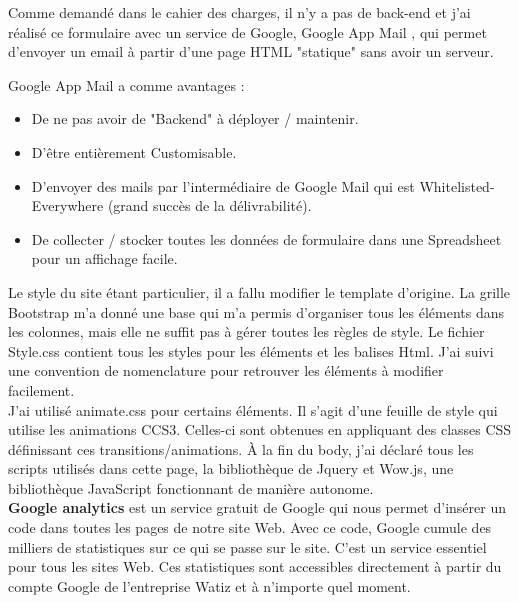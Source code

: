 \documentclass[a4paper, 12pt]{report}
\begin{document}
Comme demandé dans le cahier des charges, il n’y a pas de back-end et j’ai réalisé ce formulaire avec un service de Google, Google App Mail \cite{8}, qui permet d'envoyer un email à partir d'une page HTML "statique" sans  avoir un serveur.

Google App Mail a comme avantages :
\begin{itemize}
\item De ne pas avoir  de "Backend" à déployer / maintenir.
\item D’être entièrement Customisable.
\item D’envoyer des mails par l'intermédiaire de Google Mail qui est Whitelisted-Everywhere (grand succès de la délivrabilité).
\item De collecter / stocker toutes les données de formulaire dans une Spreadsheet pour un affichage facile.
\end{itemize}
Le style du site étant particulier, il a fallu modifier le template d’origine. La grille Bootstrap m’a donné une base qui m’a permis d'organiser tous les éléments dans les colonnes, mais elle ne suffit pas à gérer toutes les règles de style. Le fichier Style.css contient tous les styles pour les éléments et les balises Html. J’ai suivi une convention de nomenclature pour  retrouver les éléments à modifier facilement.\\
J’ai utilisé animate.css pour certains éléments. Il s’agit d’une feuille de style qui utilise les animations CCS3. Celles-ci sont obtenues en appliquant des classes CSS définissant ces transitions/animations.
À la fin du body, j’ai déclaré tous les scripts utilisés dans cette page,  la bibliothèque de Jquery et Wow.js, une bibliothèque JavaScript fonctionnant de manière autonome.\\

\textbf{Google analytics} est un service gratuit de Google qui nous permet d’insérer un code dans toutes les pages de notre site Web. Avec ce code, Google cumule des milliers de statistiques sur ce qui se passe sur le site. C’est un service essentiel pour tous les sites Web. Ces statistiques sont accessibles directement à partir du compte Google de l'entreprise Watiz et à n’importe quel moment.\\ 
\end{document}
